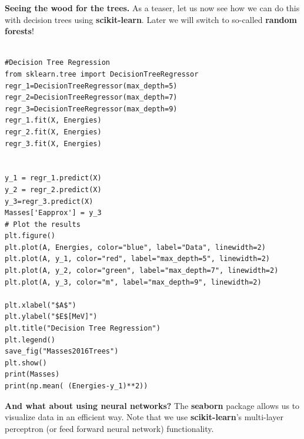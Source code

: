 \documentclass{beamer}
\begin{document}
\begin{frame}
\noindent\textbf{Seeing the wood for the trees.}
As a teaser, let us now see how we can do this with decision trees using \textbf{scikit-learn}. Later we will switch to so-called \textbf{random forests}!
































\begin{verbatim}

#Decision Tree Regression
from sklearn.tree import DecisionTreeRegressor
regr_1=DecisionTreeRegressor(max_depth=5)
regr_2=DecisionTreeRegressor(max_depth=7)
regr_3=DecisionTreeRegressor(max_depth=9)
regr_1.fit(X, Energies)
regr_2.fit(X, Energies)
regr_3.fit(X, Energies)


y_1 = regr_1.predict(X)
y_2 = regr_2.predict(X)
y_3=regr_3.predict(X)
Masses['Eapprox'] = y_3
# Plot the results
plt.figure()
plt.plot(A, Energies, color="blue", label="Data", linewidth=2)
plt.plot(A, y_1, color="red", label="max_depth=5", linewidth=2)
plt.plot(A, y_2, color="green", label="max_depth=7", linewidth=2)
plt.plot(A, y_3, color="m", label="max_depth=9", linewidth=2)

plt.xlabel("$A$")
plt.ylabel("$E$[MeV]")
plt.title("Decision Tree Regression")
plt.legend()
save_fig("Masses2016Trees")
plt.show()
print(Masses)
print(np.mean( (Energies-y_1)**2))

\end{verbatim}


\noindent\textbf{And what about using neural networks?}
The \textbf{seaborn} package allows us to visualize data in an efficient way. Note that we use \textbf{scikit-learn}'s multi-layer perceptron (or feed forward neural network) 
functionality.


































\end{frame}
\end{document}
